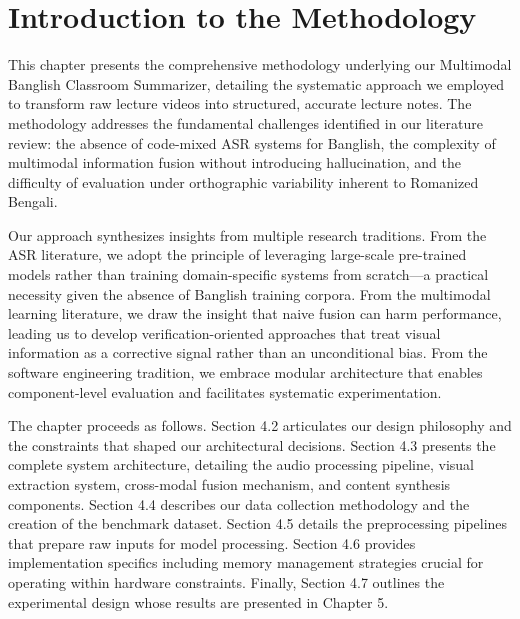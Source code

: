 
\section{Introduction to the Methodology}

This chapter presents the comprehensive methodology underlying our Multimodal Banglish Classroom Summarizer, detailing the systematic approach we employed to transform raw lecture videos into structured, accurate lecture notes. The methodology addresses the fundamental challenges identified in our literature review: the absence of code-mixed ASR systems for Banglish, the complexity of multimodal information fusion without introducing hallucination, and the difficulty of evaluation under orthographic variability inherent to Romanized Bengali.

Our approach synthesizes insights from multiple research traditions. From the ASR literature, we adopt the principle of leveraging large-scale pre-trained models rather than training domain-specific systems from scratch---a practical necessity given the absence of Banglish training corpora. From the multimodal learning literature, we draw the insight that naive fusion can harm performance, leading us to develop verification-oriented approaches that treat visual information as a corrective signal rather than an unconditional bias. From the software engineering tradition, we embrace modular architecture that enables component-level evaluation and facilitates systematic experimentation.

The chapter proceeds as follows. Section 4.2 articulates our design philosophy and the constraints that shaped our architectural decisions. Section 4.3 presents the complete system architecture, detailing the audio processing pipeline, visual extraction system, cross-modal fusion mechanism, and content synthesis components. Section 4.4 describes our data collection methodology and the creation of the benchmark dataset. Section 4.5 details the preprocessing pipelines that prepare raw inputs for model processing. Section 4.6 provides implementation specifics including memory management strategies crucial for operating within hardware constraints. Finally, Section 4.7 outlines the experimental design whose results are presented in Chapter 5.

